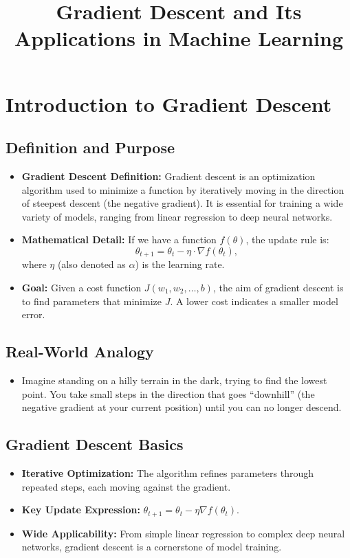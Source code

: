 \documentclass{article}
\title{Gradient Descent and Its Applications in Machine Learning}
\author{}
\date{}
\begin{document}
\maketitle

\section{Introduction to Gradient Descent}

\subsection{Definition and Purpose}
\begin{itemize}
    \item \textbf{Gradient Descent Definition:} Gradient descent is an optimization algorithm used to minimize a function by iteratively moving in the direction of steepest descent (the negative gradient). It is essential for training a wide variety of models, ranging from linear regression to deep neural networks.
    \item \textbf{Mathematical Detail:} If we have a function \( f(\theta) \), the update rule is:
    \[
    \theta_{t+1} = \theta_t - \eta \cdot \nabla f(\theta_t),
    \]
    where \(\eta\) (also denoted as \(\alpha\)) is the learning rate.
    \item \textbf{Goal:} Given a cost function \(J(w_1, w_2, \ldots, b)\), the aim of gradient descent is to find parameters that minimize \(J\). A lower cost indicates a smaller model error.
\end{itemize}

\subsection{Real-World Analogy}
\begin{itemize}
    \item Imagine standing on a hilly terrain in the dark, trying to find the lowest point. You take small steps in the direction that goes “downhill” (the negative gradient at your current position) until you can no longer descend.
\end{itemize}

\subsection{Gradient Descent Basics}
\begin{itemize}
    \item \textbf{Iterative Optimization:} The algorithm refines parameters through repeated steps, each moving against the gradient.
    \item \textbf{Key Update Expression:} \(\theta_{t+1} = \theta_t - \eta \nabla f(\theta_t)\).
    \item \textbf{Wide Applicability:} From simple linear regression to complex deep neural networks, gradient descent is a cornerstone of model training.
\end{itemize}
\end{document}
